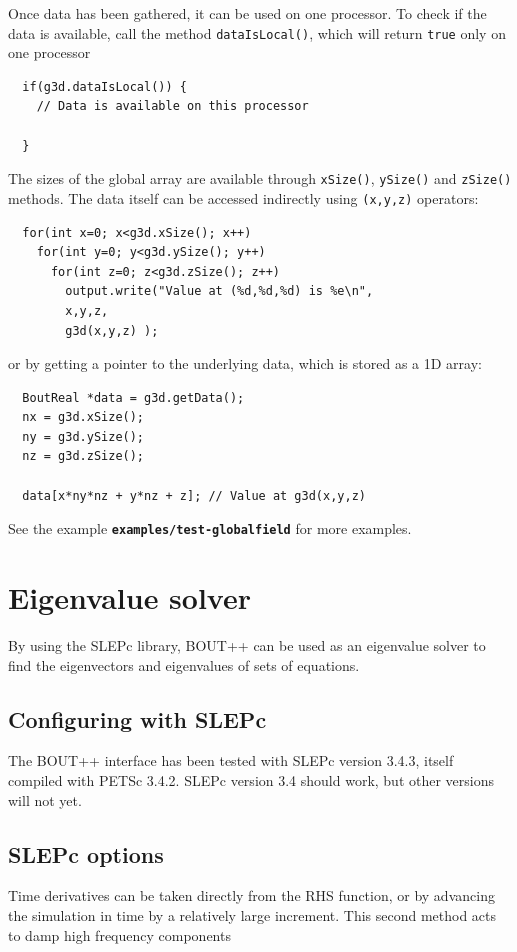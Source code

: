 \documentclass[12pt]{article}
\newcommand{\file}[1]{\texttt{\bf #1}}
\begin{document}
Once data has been gathered, it can be used on one processor. To check if the
data is available, call the method
%
\lstinline!dataIsLocal()!, which will return \lstinline!true!
%
 only on one processor
%
\begin{lstlisting}
  if(g3d.dataIsLocal()) {
    // Data is available on this processor

  }
\end{lstlisting}
%
The sizes of the global array are available through
%
\lstinline!xSize()!, \lstinline!ySize()! and \lstinline!zSize()!
%
methods. The data itself can be accessed indirectly using
%
\lstinline!(x,y,z)!
%
 operators:
%
\begin{lstlisting}
  for(int x=0; x<g3d.xSize(); x++)
    for(int y=0; y<g3d.ySize(); y++)
      for(int z=0; z<g3d.zSize(); z++)
        output.write("Value at (%d,%d,%d) is %e\n",
        x,y,z,
        g3d(x,y,z) );
\end{lstlisting}
%
or by getting a pointer to the underlying data, which is stored as a 1D array:
%
\begin{lstlisting}
  BoutReal *data = g3d.getData();
  nx = g3d.xSize();
  ny = g3d.ySize();
  nz = g3d.zSize();

  data[x*ny*nz + y*nz + z]; // Value at g3d(x,y,z)
\end{lstlisting}
%
See the example \file{examples/test-globalfield} for more examples.



\section{Eigenvalue solver}

By using the SLEPc library, BOUT++ can be used as an eigenvalue solver
to find the eigenvectors and eigenvalues of sets of equations.

\subsection{Configuring with SLEPc}

The BOUT++ interface has been tested with SLEPc version 3.4.3, itself compiled with
PETSc 3.4.2. SLEPc version 3.4 should work, but other versions will not yet.


\subsection{SLEPc options}


Time derivatives can be taken directly from the RHS function,
or by advancing the simulation in time by a relatively large increment.
This second method acts to damp high frequency components
\end{document}
